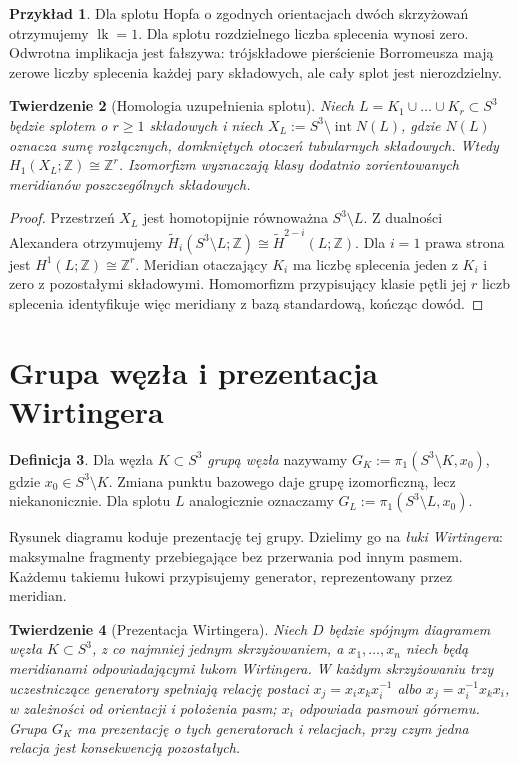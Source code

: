 \documentclass[11pt,a4paper]{report}
\numberwithin{equation}{section}
\theoremstyle{plain}
\newtheorem{twierdzenie}{Twierdzenie}[section]
\theoremstyle{definition}
\newtheorem{definicja}[twierdzenie]{Definicja}
\newtheorem{przyklad}[twierdzenie]{Przykład}
\theoremstyle{remark}
\begin{document}
\begin{przyklad}
Dla splotu Hopfa o zgodnych orientacjach dwóch skrzyżowań
otrzymujemy $\operatorname{lk}=1$. Dla splotu rozdzielnego
liczba splecenia wynosi zero. Odwrotna implikacja jest fałszywa:
trójskładowe pierścienie Borromeusza mają zerowe liczby splecenia
każdej pary składowych, ale cały splot jest nierozdzielny.
\end{przyklad}

\begin{twierdzenie}[Homologia uzupełnienia splotu]
Niech $L=K_1\cup\dots\cup K_r\subset S^3$ będzie splotem o $r\geq1$
składowych i niech $X_L:=S^3\setminus\operatorname{int}N(L)$,
gdzie $N(L)$ oznacza sumę rozłącznych, domkniętych otoczeń
tubularnych składowych. Wtedy
$H_1(X_L;\mathbb Z)\cong\mathbb Z^r$.
Izomorfizm wyznaczają klasy dodatnio zorientowanych meridianów
poszczególnych składowych.
\end{twierdzenie}

\begin{proof}
Przestrzeń $X_L$ jest homotopijnie równoważna $S^3\setminus L$.
Z dualności Alexandera otrzymujemy
$\widetilde H_i(S^3\setminus L;\mathbb Z)
\cong\widetilde H^{2-i}(L;\mathbb Z)$.
Dla $i=1$ prawa strona jest $H^1(L;\mathbb Z)\cong\mathbb Z^r$.
Meridian otaczający $K_i$ ma liczbę splecenia jeden z $K_i$
i zero z pozostałymi składowymi. Homomorfizm przypisujący
klasie pętli jej $r$ liczb splecenia identyfikuje więc
meridiany z bazą standardową, kończąc dowód.
\end{proof}

\section{Grupa węzła i prezentacja Wirtingera}
\label{sec:kt-wirtinger}

\begin{definicja}
Dla węzła $K\subset S^3$ \emph{grupą węzła} nazywamy
$G_K:=\pi_1(S^3\setminus K,x_0)$, gdzie $x_0\in S^3\setminus K$.
Zmiana punktu bazowego daje grupę izomorficzną, lecz niekanonicznie.
Dla splotu $L$ analogicznie oznaczamy $G_L:=\pi_1(S^3\setminus L,x_0)$.
\end{definicja}

Rysunek diagramu koduje prezentację tej grupy. Dzielimy go na
\emph{łuki Wirtingera}: maksymalne fragmenty przebiegające
bez przerwania pod innym pasmem. Każdemu takiemu łukowi
przypisujemy generator, reprezentowany przez meridian.

\begin{twierdzenie}[Prezentacja Wirtingera]
Niech $D$ będzie spójnym diagramem węzła $K\subset S^3$,
z co najmniej jednym skrzyżowaniem, a $x_1,\dots,x_n$ niech będą
meridianami odpowiadającymi łukom Wirtingera. W każdym skrzyżowaniu
trzy uczestniczące generatory spełniają relację postaci
$x_j=x_i x_k x_i^{-1}$ albo $x_j=x_i^{-1}x_kx_i$,
w zależności od orientacji i położenia pasm; $x_i$ odpowiada
pasmowi górnemu. Grupa $G_K$ ma prezentację o tych generatorach
i relacjach, przy czym jedna relacja jest konsekwencją pozostałych.
\end{twierdzenie}
\end{document}
